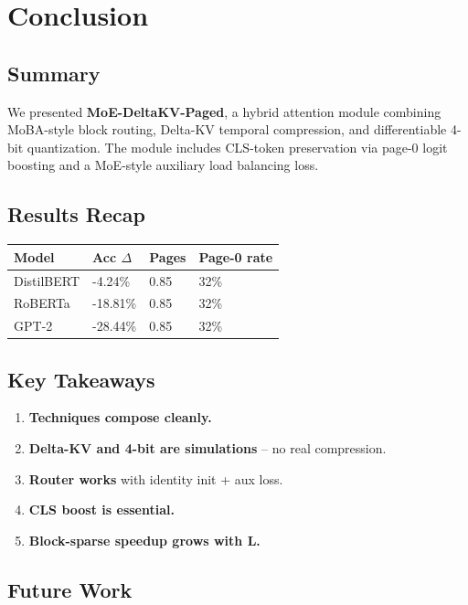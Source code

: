 \section{Conclusion}

\subsection{Summary}

We presented \textbf{MoE-DeltaKV-Paged}, a hybrid attention module combining 
MoBA-style block routing, Delta-KV temporal compression, and differentiable 
4-bit quantization. The module includes CLS-token preservation via page-0 
logit boosting and a MoE-style auxiliary load balancing loss.

\subsection{Results Recap}

\begin{table}[H]
\centering
\small
\begin{tabular}{llll}
\toprule
\textbf{Model} & \textbf{Acc $\Delta$} & \textbf{Pages} & \textbf{Page-0 rate} \\
\midrule
DistilBERT & -4.24\% & 0.85 & 32\% \\
RoBERTa & -18.81\% & 0.85 & 32\% \\
GPT-2 & -28.44\% & 0.85 & 32\% \\
\bottomrule
\end{tabular}
\end{table}

\subsection{Key Takeaways}

\begin{enumerate}
\item \textbf{Techniques compose cleanly.}
\item \textbf{Delta-KV and 4-bit are simulations} -- no real compression.
\item \textbf{Router works} with identity init + aux loss.
\item \textbf{CLS boost is essential.}
\item \textbf{Block-sparse speedup grows with L.}

\end{enumerate}
\subsection{Future Work}

